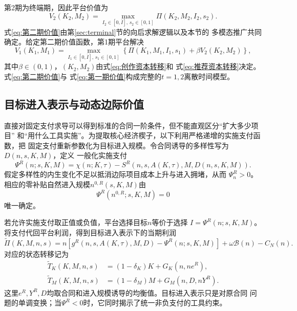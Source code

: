 \documentclass[UTF8, a4paper, 12pt, fontset=fandol]{ctexart}
\theoremstyle{definition}
\theoremstyle{remark}
\begin{document}
第2期为终端期，因此平台价值为
\begin{equation}
  V_2(K_2,M_2)
  =\max_{I_2\in[0,\bar I],\,s_2\in[0,1]}
  \Pi(K_2,M_2,I_2,s_2).
  \label{eq:第二期价值}
\end{equation}
式\eqref{eq:第二期价值}由第\ref{sec:terminal}节的向后求解逻辑以及本节的
多模态推广共同确定。给定第二期价值函数，第1期平台解决
\begin{equation}
  V_1(K_1,M_1)
  =\max_{I_1\in[0,\bar I],\,s_1\in[0,1]}
  \left\{
    \Pi(K_1,M_1,I_1,s_1)
    +\beta V_2(K_2,M_2)
  \right\},
  \label{eq:第一期价值}
\end{equation}
其中$\beta\in(0,1)$，$(K_2,M_2)$由式\eqref{eq:创作资本转移}和
式\eqref{eq:推荐资本转移}决定。式\eqref{eq:第二期价值}与
式\eqref{eq:第一期价值}构成完整的$t=1,2$离散时间模型。

\subsection{目标进入表示与动态边际价值}
直接对固定支付求导可以得到标准的合同一阶条件，但不能直观区分“扩大多少项目”
和“用什么工具实施”。为提取核心经济楔子，以下利用严格递增的实施支付函数，把
固定支付重新参数化为目标进入规模。令合同诱导的多样性写为$D(n,s,K,M)$，定义
一般化实施支付
\begin{equation}
  \Psi^R(n;s,K,M)
  =\chi(n;K,\tau)
  -S^R\!\left(n,s,A(K,\tau),M,D(n,s,K,M)\right).
  \label{eq:一般化实施支付}
\end{equation}
假定多样性的内生变化不足以抵消边际项目成本上升与进入拥堵，从而
$\Psi_n^R>0$。相应的零补贴自然进入规模$n^{0,R}(s,K,M)$由
\begin{equation}
  \Psi^R\!\left(n^{0,R};s,K,M\right)=0
  \label{eq:一般化零补贴进入}
\end{equation}
唯一确定。

若允许实施支付取正值或负值，平台选择目标$n$等价于选择
$I=\Psi^R(n;s,K,M)$。将支付代回平台利润，得到目标进入表示下的当期利润
\begin{equation}
  \widetilde\Pi(K,M,n,s)
  =n\left[g^R(n,s,A(K,\tau),M,D)-\Psi^R(n;s,K,M)\right]
  +\omega\mathcal B(n)-C_N(n).
  \label{eq:目标进入当期利润}
\end{equation}
对应的状态转移记为
\begin{align}
  \widetilde T_K(K,M,n,s)
  &=(1-\delta_K)K+G_K(n,ne^R),\label{eq:目标进入创作转移}\\
  \widetilde T_M(K,M,n,s)
  &=(1-\delta_M)M+G_M(n,D,nY^R).
  \label{eq:目标进入推荐转移}
\end{align}
这里$e^R,Y^R,D$均取合同和进入规模诱导的均衡值。目标进入表示只是对原合同
问题的单调变换；当$\Psi^R<0$时，它同时揭示了统一非负支付的工具约束。
\end{document}
